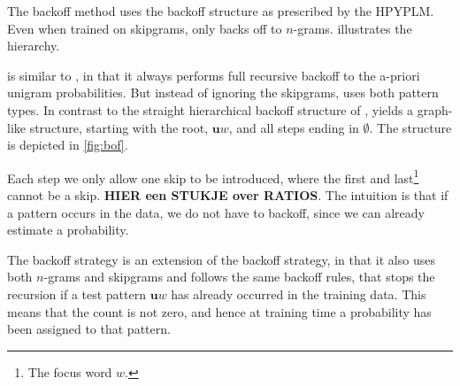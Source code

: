 The \BON backoff method uses the backoff structure as prescribed by the HPYPLM. Even when trained on skipgrams, \BON only backs off to $n$-grams.  illustrates the \BON hierarchy.



\BOF is similar to \BON, in that it always performs full recursive backoff to the a-priori unigram probabilities. But instead of ignoring the skipgrams, \BOF uses both pattern types. In contrast to the straight hierarchical backoff structure of \BON, \BOF yields a graph-like structure, starting with the root, $\mathbf{u}w$, and all steps ending in $\emptyset$. The structure is depicted in \cref{fig:bof}.



Each step we only allow one skip to be introduced, where the first and last\footnote{The focus word $w$.} cannot be a skip. \textbf{HIER een STUKJE over RATIOS}. The intuition is that if a pattern occurs in the data, we do not have to backoff, since we can already estimate a probability.

The \BOL backoff strategy is an extension of the \BOF backoff strategy, in that it also uses both $n$-grams and skipgrams and follows the same backoff rules, that stops the recursion if a test pattern $\mathbf{u}w$ has already occurred in the training data. This means that the count is not zero, and hence at training time a probability has been assigned to that pattern.

